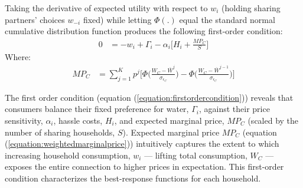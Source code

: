 \documentclass[12pt]{article}
\begin{document}

Taking the derivative of expected utility with respect to $w_i$ (holding sharing partners' choices $w_{-i}$ fixed) while letting $\Phi(.)$ equal the standard normal cumulative distribution function produces the following first-order condition:
\begin{align}
\label{equation:firstordercondition}
 0 &= - w_i + \Gamma_i - \alpha_i \Big[H_{i} +  \frac{MP_C}{S} \Big]
 \end{align}
\hspace{2cm} Where:
\begin{align}
\label{equation:weightedmarginalprice}
 MP_C &= \sum_{j=1}^{K}  p^{j} \Big [ \Phi \Big( \frac{W_C - \overline{W}^{j}}{\sigma_{\epsilon_C}} \Big) - \Phi \Big( \frac{ W_C - \overline{W}^{j-1}}{\sigma_{\epsilon_C}} \Big)   \Big ]
\end{align}

The first order condition (equation (\ref{equation:firstordercondition})) reveals that consumers balance their fixed preference for water, $\Gamma_i$, against their price sensitivity, $\alpha_i$, hassle costs, $H_i$, and expected marginal price, $MP_C$ (scaled by the number of sharing households, $S$).  Expected marginal price $MP_C$ (equation (\ref{equation:weightedmarginalprice})) intuitively captures the extent to which increasing household consumption, $w_i$ --- lifting total consumption, $W_C$ --- exposes the entire connection to higher prices in expectation.  This first-order condition characterizes the best-response functions for each household.
\end{document}
